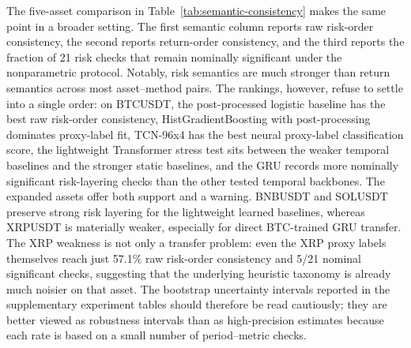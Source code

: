 \documentclass[a4paper,fleqn]{cas-dc}
\begin{document}
The five-asset comparison in Table~\ref{tab:semantic-consistency} makes the same point in a broader setting. The first semantic column reports raw risk-order consistency, the second reports return-order consistency, and the third reports the fraction of 21 risk checks that remain nominally significant under the nonparametric protocol. Notably, risk semantics are much stronger than return semantics across most asset--method pairs. The rankings, however, refuse to settle into a single order: on BTCUSDT, the post-processed logistic baseline has the best raw risk-order consistency, HistGradientBoosting with post-processing dominates proxy-label fit, TCN-96x4 has the best neural proxy-label classification score, the lightweight Transformer stress test sits between the weaker temporal baselines and the stronger static baselines, and the GRU records more nominally significant risk-layering checks than the other tested temporal backbones. The expanded assets offer both support and a warning. BNBUSDT and SOLUSDT preserve strong risk layering for the lightweight learned baselines, whereas XRPUSDT is materially weaker, especially for direct BTC-trained GRU transfer. The XRP weakness is not only a transfer problem: even the XRP proxy labels themselves reach just 57.1\% raw risk-order consistency and 5/21 nominal significant checks, suggesting that the underlying heuristic taxonomy is already much noisier on that asset. The bootstrap uncertainty intervals reported in the supplementary experiment tables should therefore be read cautiously; they are better viewed as robustness intervals than as high-precision estimates because each rate is based on a small number of period--metric checks.
\end{document}
